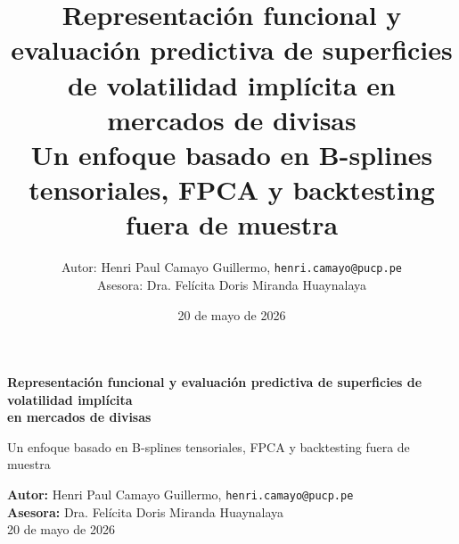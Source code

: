 \documentclass[a4paper,11pt]{article}
\title{\textbf{Representación funcional y evaluación predictiva de superficies de volatilidad implícita en mercados de divisas}\\
\large Un enfoque basado en B-splines tensoriales, FPCA y backtesting fuera de muestra}
\author{Autor: Henri Paul Camayo Guillermo, \texttt{henri.camayo@pucp.pe}\\
Asesora: Dra. Felícita Doris Miranda Huaynalaya}
\date{20 de mayo de 2026}
\begin{document}
\begin{titlepage}
  \centering
  \vspace*{\fill}
  {\Large\bfseries
    Representación funcional y evaluación predictiva de superficies de volatilidad implícita\\
    en mercados de divisas\par}
  \vspace{0.75cm}
  {\large Un enfoque basado en B-splines tensoriales, FPCA y backtesting fuera de muestra\par}
  \vspace{1.5cm}
  \normalsize
  \textbf{Autor:} Henri Paul Camayo Guillermo, \texttt{henri.camayo@pucp.pe}\\
  \textbf{Asesora:} Dra. Felícita Doris Miranda Huaynalaya\\
  \vspace{1.5cm}
  20 de mayo de 2026
  \vspace*{\fill}
\end{titlepage}
\end{document}
